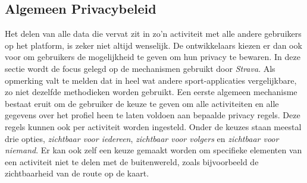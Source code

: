 \subsection{Algemeen Privacybeleid}\label{Algemene Privacy}
Het delen van alle data die vervat zit in zo'n activiteit met alle andere
gebruikers op het platform, is zeker niet altijd wenselijk. De ontwikkelaars
kiezen er dan ook voor om gebruikers de mogelijkheid te geven om hun privacy te
bewaren. In deze sectie wordt de focus gelegd op de mechanismen gebruikt door
\textit{Strava}. Als opmerking valt te melden dat in heel wat andere
sport-applicaties vergelijkbare, zo niet dezelfde methodieken worden gebruikt.
Een eerste algemeen mechanisme bestaat eruit om de gebruiker de keuze te geven
om alle activiteiten en alle gegevens over het profiel heen te laten voldoen
aan bepaalde privacy regels. Deze regels kunnen ook per activiteit worden
ingesteld. Onder de keuzes staan meestal drie opties, \textit{zichtbaar voor
    iedereen}, \textit{zichtbaar voor volgers} en \textit{zichtbaar voor niemand}.
Er kan ook zelf een keuze gemaakt worden om specifieke elementen van een
activiteit niet te delen met de buitenwereld, zoals bijvoorbeeld de
zichtbaarheid van de route op de kaart.\cite{Activity24:online}

